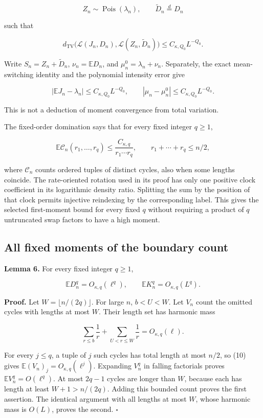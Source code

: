 \documentclass[
  11pt,
]{article}
\begin{document}
\[
Z_n\sim\operatorname{Pois}(\lambda_n),\qquad
\widetilde D_n\overset d=D_n
\]

such that

\[
d_{\mathrm{TV}}\bigl(\mathcal L(J_n,D_n),
\mathcal L(Z_n,\widetilde D_n)\bigr)
\le C_{\kappa,Q_0}L^{-Q_0}.
\tag{8}
\]

Write \(S_n=Z_n+\widetilde D_n\), \(\nu_n=\mathbb ED_n\), and
\(\mu_n^0=\lambda_n+\nu_n\). Separately, the exact mean-switching
identity and the polynomial intensity error give

\[
|\mathbb EJ_n-\lambda_n|\le C_{\kappa,Q_0}L^{-Q_0},
\qquad |\mu_n-\mu_n^0|\le C_{\kappa,Q_0}L^{-Q_0}.
\tag{9}
\]

This is not a deduction of moment convergence from total variation.

The fixed-order domination says that for every fixed integer \(q\ge1\),

\[
\mathbb E\mathcal C_n(r_1,\ldots,r_q)
\le\frac{C_{\kappa,q}}{r_1\cdots r_q},
\qquad r_1+\cdots+r_q\le n/2,
\tag{10}
\]

where \(\mathcal C_n\) counts ordered tuples of distinct cycles, also
when some lengths coincide. The rate-oriented rotation used in its proof
has only one positive clock coefficient in its logarithmic density
ratio. Splitting the sum by the position of that clock permits injective
reindexing by the corresponding label. This gives the selected
first-moment bound for every fixed \(q\) without requiring a product of
\(q\) untruncated swap factors to have a high moment.

\subsection{All fixed moments of the boundary
count}\label{all-fixed-moments-of-the-boundary-count}


\textbf{Lemma 6.} For every fixed integer \(q\ge1\),

\[
\mathbb ED_n^q=O_{\kappa,q}(\ell^q),\qquad
\mathbb EK_n^q=O_{\kappa,q}(L^q).
\tag{11}
\]

\textbf{Proof.} Let \(W=\lfloor n/(2q)\rfloor\). For large \(n\),
\(b<U<W\). Let \(V_n\) count the omitted cycles with lengths at most
\(W\). Their length set has harmonic mass

\[
\sum_{r\le b}\frac1r+\sum_{U<r\le W}\frac1r=O_{\kappa,q}(\ell).
\]

For every \(j\le q\), a tuple of \(j\) such cycles has total length at
most \(n/2\), so (10) gives \(\mathbb E(V_n)_j=O_{\kappa,q}(\ell^j)\).
Expanding \(V_n^q\) in falling factorials proves
\(\mathbb EV_n^q=O(\ell^q)\). At most \(2q-1\) cycles are longer than
\(W\), because each has length at least \(W+1>n/(2q)\). Adding this
bounded count proves the first assertion. The identical argument with
all lengths at most \(W\), whose harmonic mass is \(O(L)\), proves the
second. \(\square\)
\end{document}
